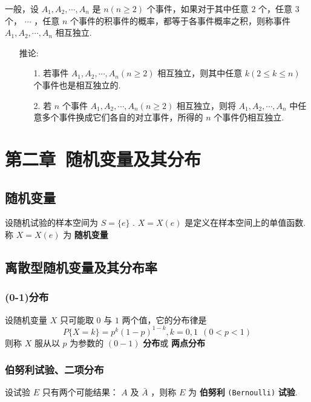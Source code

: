\documentclass[UTF8,10pt]{ctexart}
\begin{document}
	一般，设 $ A_{1},A_{2}, \cdots ,A_{n} $ 是 $ n(n \ge 2) $ 个事件，如果对于其中任意 $ 2 $ 个，任意 $ 3 $ 个， $ \cdots $ ，任意 $ n $ 个事件的积事件的概率，都等于各事件概率之积，则称事件 $ A_{1},A_{2}, \cdots ,A_{n} $ 相互独立.
	
	\begin{itemize}
		\item [推论:] {
			\begin{enumerate}
				\item [1.] 若事件 $ A_{1},A_{2}, \cdots ,A_{n}(n \ge 2) $ 相互独立，则其中任意 $ k(2 \le k \le n) $ 个事件也是相互独立的.
				\item [2.] 若 $ n $ 个事件 $ A_{1},A_{2}, \cdots ,A_{n}(n \ge 2) $ 相互独立，则将 $ A_{1},A_{2}, \cdots ,A_{n} $ 中任意多个事件换成它们各自的对立事件，所得的 $ n $ 个事件仍相互独立.
			\end{enumerate}
		}
	\end{itemize}
	
	\section{第二章\ 随机变量及其分布}
	
	\subsection{随机变量}
	
	设随机试验的样本空间为 $ S=\{e\} $ . $ X=X(e) $ 是定义在样本空间上的单值函数.称 $ X=X(e) $ 为 \textbf{随机变量}
	
	\subsection{离散型随机变量及其分布率}
	
	\subsubsection{(0-1)分布}
	
	设随机变量 $ X $ 只可能取 $ 0 $ 与 $ 1 $ 两个值，它的分布律是 $$ P\{X=k\}=p^{k}(1-p)^{1-k},k=0,1\ \ (0<p<1) $$ 则称 $ X $ 服从以 $ p $ 为参数的 $ (0-1) $ \textbf{分布}或 \textbf{两点分布}
	
	\subsubsection{伯努利试验、二项分布}
	
	设试验 $ E $ 只有两个可能结果： $ A $ 及 $ \bar{A} $ ，则称 $ E $ 为 \textbf{伯努利} \texttt{(Bernoulli)} \textbf{试验}.
	
\end{document}
